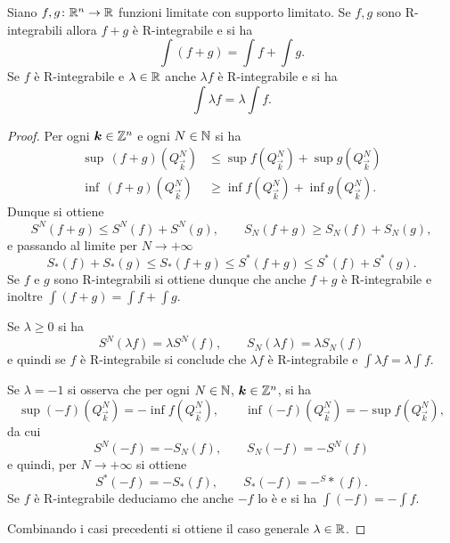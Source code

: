 \begin{theorem}
Siano $f,g\colon {\mathbb R}^n \to {\mathbb R}$ funzioni limitate con supporto limitato.
Se $f,g$ sono R-integrabili allora $f+g$ è R-integrabile e si ha 
\[
    \int (f+g) = \int f + \int g.
\]
Se $f$ è R-integrabile e $\lambda\in {\mathbb R}$ anche $\lambda f$ è R-integrabile 
e si ha 
\[
    \int \lambda f = \lambda \int f.
\]
\end{theorem}
\begin{proof}
Per ogni $\boldsymbol k\in{\mathbb Z}^n$ e ogni $N\in {\mathbb N}$
si ha
\begin{align*}
  \sup\, (f+g)(Q^N_{\vec k}) &\le \sup f(Q^N_{\vec k}) + \sup g(Q^N_{\vec k})\\
  \inf\, (f+g)(Q^N_{\vec k}) &\ge \inf f(Q^N_{\vec k}) + \inf g(Q^N_{\vec k}).
\end{align*}
Dunque si ottiene
\[
    S^N(f+g) \le S^N(f) + S^N(g),  \qquad
    S_N(f+g) \ge S_N(f) + S_N(g), 
\]
e passando al limite per $N\to +\infty$ 
\[
   S_*(f) + S_*(g) \le S_*(f+g) \le S^*(f+g) \le S^*(f) + S^*(g).
\]
Se $f$ e $g$ sono R-integrabili si ottiene dunque che anche $f+g$ 
è R-integrabile e inoltre $\int (f+g) = \int f + \int g$.

Se $\lambda \ge 0$ si ha 
\[
   S^N(\lambda f) = \lambda S^N(f), \qquad S_N(\lambda f) = \lambda S_N(f)
\]
e quindi se $f$ è R-integrabile si conclude 
che $\lambda f$ è R-integrabile e $\int \lambda f = \lambda \int f$.

Se $\lambda = -1$ si osserva che per ogni $N\in {\mathbb N}$, $\boldsymbol k\in {\mathbb Z}^n$, 
si ha 
\[
   \sup (-f)(Q^N_{\vec k}) = -\inf f(Q^N_{\vec k}),
   \qquad 
   \inf (-f)(Q^N_{\vec k}) = -\sup f(Q^N_{\vec k}),
\]
da cui 
\[
    S^N(-f) = -S_N(f), \qquad S_N(-f) = -S^N(f)
\]
e quindi, per $N\to +\infty$ si ottiene 
\[
  S^*(-f) = -S_*(f), \qquad S_*(-f) = - ^S*(f).
\]
Se $f$ è R-integrabile deduciamo che anche $-f$ lo è e si ha 
$\int (-f) = -\int f$.

Combinando i casi precedenti si ottiene il caso generale $\lambda \in {\mathbb R}$.
\end{proof}

